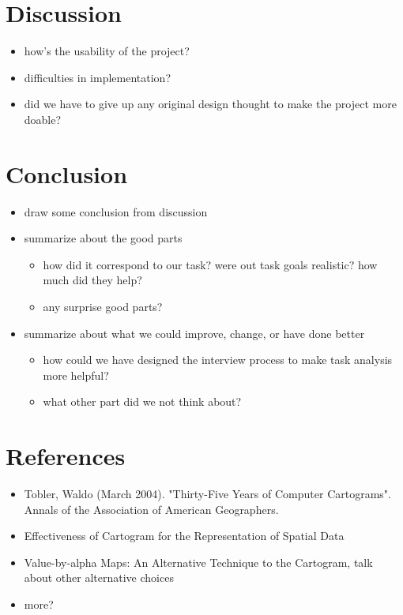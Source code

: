 \documentclass[journal]{vgtc}                %
\begin{document}
\section{Discussion}
\begin{itemize}
\item how's the usability of the project?
\item difficulties in implementation?
\item did we have to give up any original design thought to make the project more doable?
\end{itemize}

\section{Conclusion}
\begin{itemize}
\item draw some conclusion from discussion
\item summarize about the good parts
\begin{itemize}
\item how did it correspond to our task? were out task goals realistic? how much did they help?
\item any surprise good parts?
\end{itemize}
\item summarize about what we could improve, change, or have done better
\begin{itemize}
\item how could we have designed the interview process to make task analysis more helpful?
\item what other part did we not think about?
\end{itemize}
\end{itemize}

\section{References}

\begin{itemize}

\item Tobler, Waldo (March 2004). "Thirty-Five Years of Computer Cartograms". Annals of the Association of American Geographers.
\item Effectiveness of Cartogram for the Representation of Spatial Data

\item Value-by-alpha Maps: An Alternative Technique to the Cartogram, talk about other alternative choices

\item more?

\end{itemize}



%

%
%
%


\end{document}
